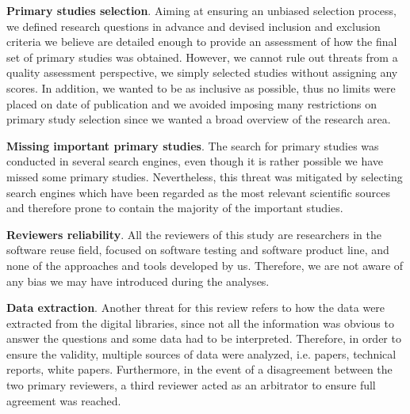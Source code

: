 \textbf{Primary studies selection}. Aiming at ensuring an unbiased selection process, we defined research questions in advance and devised inclusion and exclusion criteria we believe are detailed enough to provide an assessment of how the final set of primary studies was obtained. However, we cannot rule out threats from a quality assessment perspective, we simply selected studies without assigning any scores. In addition, we wanted to be as inclusive as possible, thus no limits were placed on date of publication and we avoided imposing many restrictions on primary study selection since we wanted a broad overview of the research area.

\textbf{Missing important primary studies}. The search for primary studies was conducted in several search engines, even though it is rather possible we have missed some primary studies. Nevertheless, this threat was mitigated by selecting search engines which have been regarded as the most relevant scientific sources~\cite{Dyba} and therefore prone to contain the majority of the important studies.

\textbf{Reviewers reliability}. All the reviewers of this study are researchers in the software reuse field, focused on software testing and software product line, and none of the approaches and tools developed by us. Therefore, we are not aware of any bias we may have introduced during the analyses.

\textbf{Data extraction}. Another threat for this review refers to how the data were extracted from the digital libraries, since not all the information was obvious to answer the questions and some data had to be interpreted. Therefore, in order to ensure the validity, multiple sources of data were analyzed, i.e. papers, technical reports, white papers. Furthermore, in the event of a disagreement between the two primary reviewers, a third reviewer acted as an arbitrator to ensure full agreement was reached.